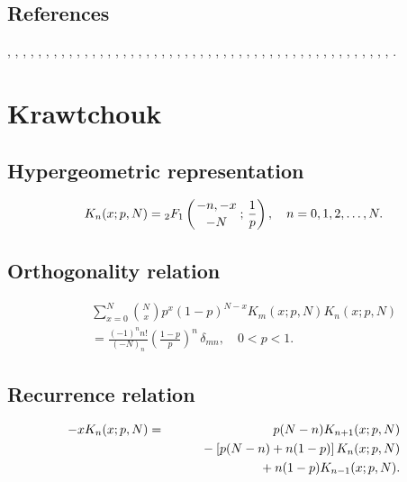 \documentclass[envcountchap,graybox]{svmono}
\newcommand{\hyp}[5]{\mbox{}_{#1}{F}_{#2}
\left(\genfrac{}{}{0pt}{}{#3}{#4}\,;\,#5\right)}
\newcommand{\mathindent}{\hspace{7.5mm}}
\begin{document}
\subsection*{References}
\cite{Allaway76}, \cite{NAlSalam66}, \cite{AlSalam90}, \cite{AlSalamChihara76},
\cite{AlSalamIsmail76}, \cite{Alvarez+}, \cite{AndrewsAskey85}, \cite{Area+II}, \cite{Askey75},
\cite{Askey89I}, \cite{Askey2005}, \cite{AskeyGasper77}, \cite{AskeyIsmail76},
\cite{AskeyWilson85}, \cite{AtakRahmanSuslov}, \cite{AtakSuslov88}, \cite{Bavinck98},
\cite{BavinckHaeringen}, \cite{Campigotto+}, \cite{Chihara78}, \cite{Cooper+},
\cite{Erdelyi+}, \cite{FoataLabelle}, \cite{Gabutti}, \cite{GabuttiMathis}, \cite{Gasper73I},
\cite{Gasper74}, \cite{HoareRahman}, \cite{Ismail2005II}, \cite{IsmailLetVal88},
\cite{IsmailLi}, \cite{IsmailMuldoon}, \cite{IsmailStanton97}, \cite{JinWong},
\cite{Karlin58}, \cite{Koekoek2000}, \cite{Koorn88}, \cite{LabelleYehI}, \cite{LabelleYehII},
\cite{Lesky89}, \cite{Lesky94I}, \cite{Lesky95II}, \cite{LewanowiczII}, \cite{Meixner},
\cite{Nikiforov+}, \cite{NikiforovUvarov}, \cite{Rahman78I}, \cite{ValentAssche},
\cite{Viennot}, \cite{Zarzo+}, \cite{Zeng90}.


\section{Krawtchouk}

\par\setcounter{equation}{0}

\subsection*{Hypergeometric representation}
\begin{equation}
\label{DefKrawtchouk}
K_n(x;p,N)=\hyp{2}{1}{-n,-x}{-N}{\frac{1}{p}},\quad n=0,1,2,\ldots,N.
\end{equation}

\subsection*{Orthogonality relation}
\begin{eqnarray}
\label{OrtKrawtchouk}
& &\sum_{x=0}^N\binom{N}{x}p^x(1-p)^{N-x} K_m(x;p,N)K_n(x;p,N)\nonumber\\
& &{}=\frac{(-1)^nn!}{(-N)_n}\left(\frac{1-p}{p}\right)^n\,\delta_{mn},\quad0 < p < 1.
\end{eqnarray}

\subsection*{Recurrence relation}
\begin{eqnarray}
\label{RecKrawtchouk}
-xK_n(x;p,N)&=&p(N-n)K_{n+1}(x;p,N)\nonumber\\
& &{}\mathindent{}-\left[p(N-n)+n(1-p)\right]K_n(x;p,N)\nonumber\\
& &{}\mathindent\mathindent{}+n(1-p)K_{n-1}(x;p,N).
\end{eqnarray}
\end{document}

